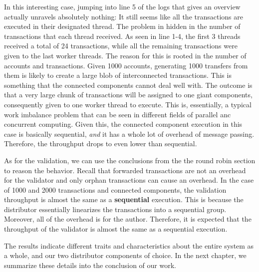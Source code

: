 \begin{itemize}
	In this interesting case, jumping into line 5 of the logs that gives an overview actually
	unravels absolutely nothing: It still seems like all the transactions are executed in their
	designated thread. The problem in hidden in the number of transactions that each thread
	received. As seen in line 1-4, the first 3 threads received a total of 24 transactions, while
	all the remaining transactions were given to the last worker threads. The reason for this is
	rooted in the number of accounts and transactions. Given 1000 accounts, generating 1000
	transfers from them is likely to create a large blob of interconnected transactions. This is
	something that the connected components cannot deal well with. The outcome is that a very large
	chunk of transactions will be assigned to one giant components, consequently given to one worker
	thread to execute. This is, essentially, a typical work imbalance problem that can be seen in
	different fields of parallel anc concurrent computing. Given this, the connected component
	execution in this case is basically sequential, \textit{and} it has a whole lot of overhead of
	message passing. Therefore, the throughput drops to even lower than sequential.

	As for the validation, we can use the conclusions from the the round robin section to reason the
	behavior. Recall that forwarded transactions are not an overhead for the validator and only
	orphan transactions can cause an overhead. In the case of 1000 and 2000 transactions and
	connected components, the validation throughput is almost the same as a \textbf{sequential}
	execution. This is because the distributor essentially linearizes the transactions into a
	sequential group. Moreover, all of the overhead is for the author. Therefore, it is expected
	that the throughput of the validator is almost the same as a sequential execution.
\end{itemize}

The results indicate different traits and characteristics about the entire system as a whole, and
our two distributor components of choice. In the next chapter, we summarize these details into the
conclusion of our work.


